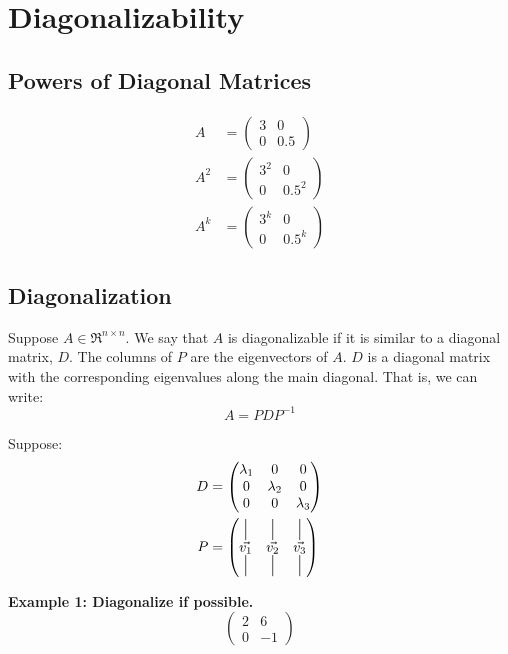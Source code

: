 \section{Diagonalizability}
\subsection{Powers of Diagonal Matrices}
\begin{align}
    A &= \begin{pmatrix}
        3 & 0 \\ 0 & 0.5
    \end{pmatrix} \\
    A^2 &= \begin{pmatrix}
        3^2 & 0 \\ 0 & 0.5^2
    \end{pmatrix} \\
    A^k &= \begin{pmatrix}
        3^k & 0 \\ 0 & 0.5^k
    \end{pmatrix}
\end{align}

\subsection{Diagonalization}
\begin{definition}
    Suppose \(A \in \Re^{n \times n}\). We say that \(A\) is diagonalizable if it is similar to a diagonal matrix, \(D\). The columns of \(P\) are the eigenvectors of \(A\). \(D\) is a diagonal matrix with the corresponding eigenvalues along the main diagonal. That is, we can write:
    \[A = P D P^{-1}\]
\end{definition}

\noindent
Suppose:
\begin{align}
    D &= \begin{pmatrix}
        \lambda_1 & 0 & 0 \\
        0 & \lambda_2 & 0 \\
        0 & 0 & \lambda_3
    \end{pmatrix} \\
    P &= \begin{pmatrix}
            \spike{15pt}{$\Vec{v_1}$}  & \spike{15pt}{$\Vec{v_2}$} & \spike{15pt}{$\Vec{v_3}$}
        \end{pmatrix}
\end{align}

\noindent
\newline
\textbf{Example 1: Diagonalize if possible.}
\begin{equation}
    \begin{pmatrix}
        2 & 6 \\ 0 & -1
    \end{pmatrix}
\end{equation}

